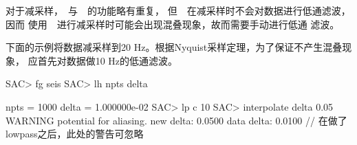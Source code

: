 对于减采样，~与~~的功能略有重复，
但~~在减采样时不会对数据进行低通滤波，因而
使用~~进行减采样时可能会出现混叠现象，故而需要手动进行低通
滤波。

下面的示例将数据减采样到20 Hz。根据Nyquist采样定理，为了保证不产生混叠现象，
应首先对数据做10 Hz的低通滤波。
\begin{SACCode}
SAC> fg seis
SAC> lh npts delta

     npts = 1000
     delta = 1.000000e-02
SAC> lp c 10
SAC> interpolate delta 0.05
WARNING potential for aliasing. new delta: 0.0500 data delta: 0.0100
    //  在做了lowpass之后，此处的警告可忽略
\end{SACCode}
